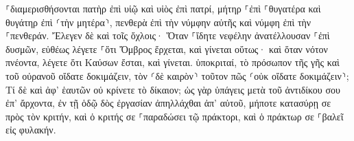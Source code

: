 \documentclass{openreader}
\begin{document}
⸀διαμερισθήσονται πατὴρ ἐπὶ υἱῷ καὶ υἱὸς ἐπὶ πατρί, μήτηρ ⸀ἐπὶ ⸀θυγατέρα καὶ θυγάτηρ ἐπὶ ⸂τὴν μητέρα⸃, πενθερὰ ἐπὶ τὴν νύμφην αὐτῆς καὶ νύμφη ἐπὶ τὴν ⸀πενθεράν. 
Ἔλεγεν δὲ καὶ τοῖς ὄχλοις· Ὅταν ⸀ἴδητε νεφέλην ἀνατέλλουσαν ⸀ἐπὶ δυσμῶν, εὐθέως λέγετε ⸀ὅτι Ὄμβρος ἔρχεται, καὶ γίνεται οὕτως· 
καὶ ὅταν νότον πνέοντα, λέγετε ὅτι Καύσων ἔσται, καὶ γίνεται. 
ὑποκριταί, τὸ πρόσωπον τῆς γῆς καὶ τοῦ οὐρανοῦ οἴδατε δοκιμάζειν, τὸν ⸂δὲ καιρὸν⸃ τοῦτον πῶς ⸂οὐκ οἴδατε δοκιμάζειν⸃; 
Τί δὲ καὶ ἀφ’ ἑαυτῶν οὐ κρίνετε τὸ δίκαιον; 
ὡς γὰρ ὑπάγεις μετὰ τοῦ ἀντιδίκου σου ἐπ’ ἄρχοντα, ἐν τῇ ὁδῷ δὸς ἐργασίαν ἀπηλλάχθαι ἀπ’ αὐτοῦ, μήποτε κατασύρῃ σε πρὸς τὸν κριτήν, καὶ ὁ κριτής σε ⸀παραδώσει τῷ πράκτορι, καὶ ὁ πράκτωρ σε ⸀βαλεῖ εἰς φυλακήν. 
\end{document}
